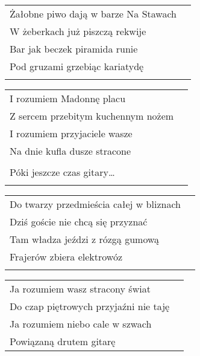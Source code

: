 \documentclass[a5paper]{article}
\begin{document}
\noindent
\begin{tabular}{@{}p{7.50cm}p{3cm}@{}}
Żałobne piwo dają w barze Na Stawach \\
W żeberkach już piszczą rekwije \\
Bar jak beczek piramida runie \\
Pod gruzami grzebiąc kariatydę \\ \\
\end{tabular}

\noindent
\begin{tabular}{@{}p{7.50cm}p{3cm}@{}}
I rozumiem Madonnę placu \\
Z sercem przebitym kuchennym nożem \\
I rozumiem przyjaciele wasze \\
Na dnie kufla dusze stracone \\ \\

Póki jeszcze czas gitary… \\ \\
\end{tabular}

\noindent
\begin{tabular}{@{}p{7.50cm}p{3cm}@{}}
Do twarzy przedmieścia całej w bliznach \\
Dziś goście nie chcą się przyznać \\
Tam władza jeździ z rózgą gumową \\
Frajerów zbiera elektrowóz \\ \\
\end{tabular}

\noindent
\begin{tabular}{@{}p{7.50cm}p{3cm}@{}}
Ja rozumiem wasz stracony świat \\
Do czap piętrowych przyjaźni nie taję \\
Ja rozumiem niebo cale w szwach \\
Powiązaną drutem gitarę
\end{tabular}
\end{document}
